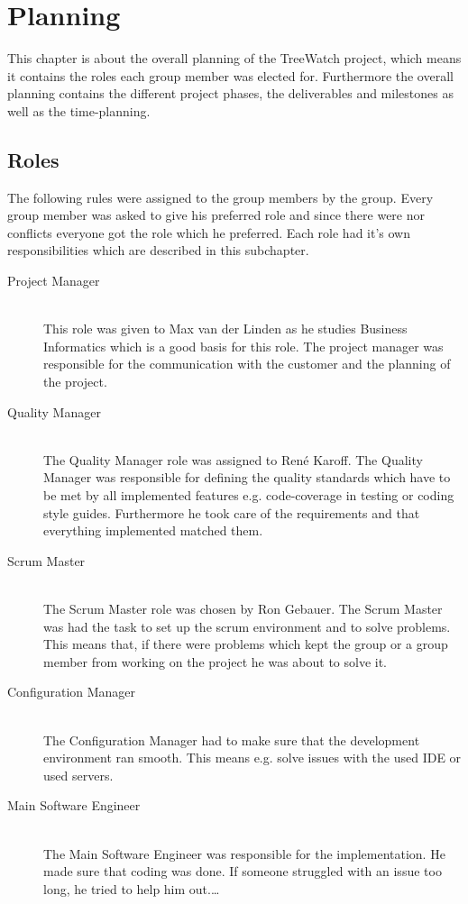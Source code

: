 \section{Planning}
This chapter is about the overall planning of the TreeWatch project, which means it contains the roles each group member was elected for. Furthermore the overall planning contains the different project phases, the deliverables and milestones as well as the time-planning.
\subsection{Roles}
The following rules were assigned to the group members by the group. Every group member was asked to give his preferred role and since there were nor conflicts everyone got the role which he preferred. Each role had it's own responsibilities which are described in this subchapter.
\begin{description}
	\item[Project Manager] \hfill \\
	This role was given to Max van der Linden as he studies Business Informatics which is a good basis for this role. The project manager was responsible for the communication with the customer and the planning of the project.
	\item[Quality Manager] \hfill \\
	The Quality Manager  role was assigned to René Karoff. The Quality Manager was responsible for defining the quality standards which have to be met by all implemented features e.g. code-coverage in testing or coding style guides. Furthermore he took care of the requirements and that everything implemented matched them.
	\item[Scrum Master] \hfill \\
	The Scrum Master role was chosen by Ron Gebauer. The Scrum Master was had the task to set up the scrum environment and to solve problems. This means that, if there were problems which kept the group or a group member from working on the project he was about to solve it.
	\item[Configuration Manager] \hfill \\
	The Configuration Manager had to make sure that the development environment ran smooth. This means e.g. solve issues with the used IDE or used servers.
	\item[Main Software Engineer] \hfill \\
	The Main Software Engineer was responsible for the implementation. He made sure that coding was done. If someone struggled with an issue too long, he tried to help him out.\ldots
\end{description}










